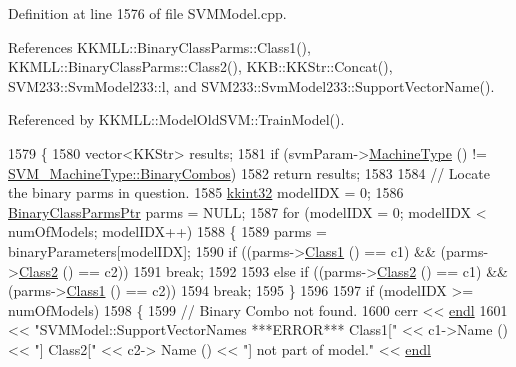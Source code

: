 Definition at line 1576 of file S\+V\+M\+Model.\+cpp.



References K\+K\+M\+L\+L\+::\+Binary\+Class\+Parms\+::\+Class1(), K\+K\+M\+L\+L\+::\+Binary\+Class\+Parms\+::\+Class2(), K\+K\+B\+::\+K\+K\+Str\+::\+Concat(), S\+V\+M233\+::\+Svm\+Model233\+::l, and S\+V\+M233\+::\+Svm\+Model233\+::\+Support\+Vector\+Name().



Referenced by K\+K\+M\+L\+L\+::\+Model\+Old\+S\+V\+M\+::\+Train\+Model().


\begin{DoxyCode}
1579 \{
1580   vector<KKStr>  results;
1581   \textcolor{keywordflow}{if}  (svmParam->\hyperlink{class_k_k_m_l_l_1_1_s_v_mparam_a30153e00007f9cf65343e0ad97ad61fb}{MachineType} () != \hyperlink{namespace_k_k_m_l_l_ad917464bc631109a3021cf02cd27af9aa01ad67463554c5f5552dcc6b5f4a553f}{SVM\_MachineType::BinaryCombos})
1582     \textcolor{keywordflow}{return}  results;
1583 
1584   \textcolor{comment}{// Locate the binary parms in question.}
1585   \hyperlink{namespace_k_k_b_a8fa4952cc84fda1de4bec1fbdd8d5b1b}{kkint32}  modelIDX = 0;
1586   \hyperlink{class_k_k_m_l_l_1_1_binary_class_parms}{BinaryClassParmsPtr}  parms = NULL;
1587   \textcolor{keywordflow}{for}  (modelIDX = 0;  modelIDX < numOfModels;  modelIDX++)
1588   \{
1589     parms = binaryParameters[modelIDX];
1590     \textcolor{keywordflow}{if}  ((parms->\hyperlink{class_k_k_m_l_l_1_1_binary_class_parms_aa8519ac2f7f7e4553143e12786209415}{Class1} () == c1)  &&  (parms->\hyperlink{class_k_k_m_l_l_1_1_binary_class_parms_a38ea0c5dd0416d6aef402befeaf7a220}{Class2} () == c2))
1591       \textcolor{keywordflow}{break};
1592 
1593     \textcolor{keywordflow}{else} \textcolor{keywordflow}{if}  ((parms->\hyperlink{class_k_k_m_l_l_1_1_binary_class_parms_a38ea0c5dd0416d6aef402befeaf7a220}{Class2} () == c1)  &&  (parms->\hyperlink{class_k_k_m_l_l_1_1_binary_class_parms_aa8519ac2f7f7e4553143e12786209415}{Class1} () == c2))
1594       \textcolor{keywordflow}{break};
1595   \}
1596 
1597   \textcolor{keywordflow}{if}  (modelIDX >= numOfModels)
1598   \{
1599     \textcolor{comment}{// Binary Combo not found.}
1600     cerr << \hyperlink{namespace_k_k_b_ad1f50f65af6adc8fa9e6f62d007818a8}{endl}
1601          << \textcolor{stringliteral}{"SVMModel::SupportVectorNames   ***ERROR***  Class1["} << c1->Name () << \textcolor{stringliteral}{"]  Class2["} << c2->
      Name () << \textcolor{stringliteral}{"]  not part of model."} << \hyperlink{namespace_k_k_b_ad1f50f65af6adc8fa9e6f62d007818a8}{endl}

\end{DoxyCode}
